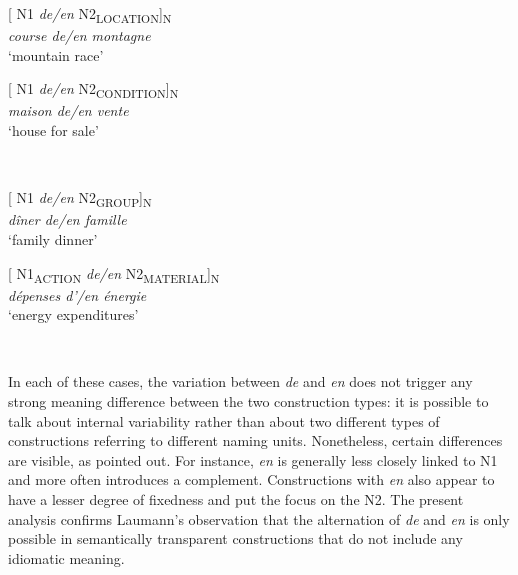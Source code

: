 \documentclass[output=paper]{langsci/langscibook}
\begin{document}
\begin{minipage}{0.4\textwidth}    %
[ N1 \textit{de/en} N2\textsubscript{LOCATION}]\textsubscript{N}\\
\textit{course de/en montagne}\\
`mountain race'
\end{minipage}
\hfill            %
\begin{minipage}{0.4\textwidth}
[ N1 \textit{de/en} N2\textsubscript{CONDITION}]\textsubscript{N}\\
\textit{maison de/en vente}\\
`house for sale'
\end{minipage} \\
\hfill
\vspace{0.5cm}

\begin{minipage}{0.4\textwidth}    %
[ N1 \textit{de/en} N2\textsubscript{GROUP}]\textsubscript{N}\\
\textit{dîner de/en famille}\\
`family dinner'
\end{minipage}
\hfill            %
\begin{minipage}{0.4\textwidth}
[ N1\textsubscript{ACTION} \textit{de/en} N2\textsubscript{MATERIAL}]\textsubscript{N}\\
\textit{dépenses d'/en énergie }\\
`energy expenditures'
\end{minipage} \\
\hfill
\vspace{0.5cm}

In each of these cases, the variation between \textit{de} and \textit{en} does not trigger any strong meaning difference between the two construction types: it is possible to talk about internal variability rather than about two different types of constructions referring to different naming units. Nonetheless, certain differences are visible, as \citet{Laumann:1998} pointed out. For instance, \textit{en} is generally less closely linked to N1 and more often introduces a complement. Constructions with \textit{en} also appear to have a lesser degree of fixedness and put the focus on the N2. The present analysis confirms Laumann’s observation that the alternation of \textit{de} and \textit{en} is only possible in semantically transparent constructions that do not include any idiomatic meaning.\\   
\end{document}

